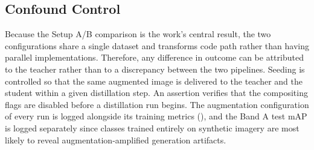 \subsection{Confound Control}\label{sec:augmentation_reproducibility}

Because the Setup A/B comparison is the work's central result, the two configurations share a single dataset and transforms code path rather than having parallel implementations. Therefore, any difference in outcome can be attributed to the teacher rather than to a discrepancy between the two pipelines. Seeding is controlled so that the same augmented image is delivered to the teacher and the student within a given distillation step. An assertion verifies that the compositing flags are disabled before a distillation run begins. The augmentation configuration of every run is logged alongside its training metrics (), and the Band A test mAP is logged separately since classes trained entirely on synthetic imagery are most likely to reveal augmentation-amplified generation artifacts.
